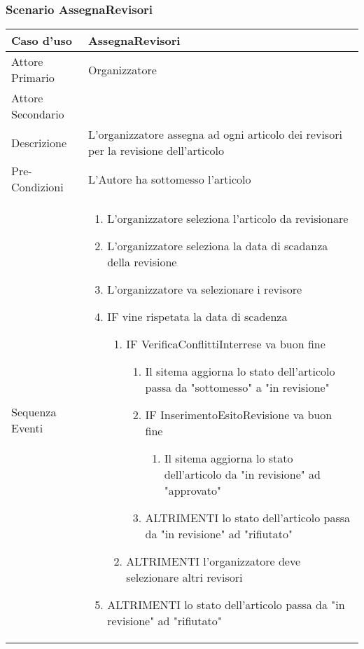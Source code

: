 \subsubsection{Scenario AssegnaRevisori}
\begin{tabular}{|p{3cm}|p{7cm}|}
\hline 
\rowcolor{Orchid}
Caso d'uso & AssegnaRevisori\\
\hline
Attore Primario & Organizzatore\\
\hline
Attore Secondario & \\
\hline
Descrizione &L'organizzatore  assegna ad ogni articolo dei revisori per la revisione dell'articolo\\
\hline
Pre-Condizioni& L'Autore ha sottomesso l'articolo\\
\hline
  Sequenza Eventi&
                   \begin{enumerate}
                   \item L'organizzatore seleziona l'articolo da revisionare
                   \item L'organizzatore seleziona la data di scadanza della revisione
                   \item L'organizzatore va selezionare i revisore
                   \item IF vine rispetata la data di scadenza
                   \begin{enumerate}
                    \item IF VerificaConflittiInterrese va buon fine
                    \begin{enumerate}
                      \item Il sitema aggiorna lo stato dell'articolo passa da "sottomesso" a "in revisione"
                      \item IF InserimentoEsitoRevisione va buon fine
                      \begin{enumerate}
                        \item Il sitema aggiorna lo stato dell'articolo da "in revisione" ad "approvato"
                      \end{enumerate}
                      \item ALTRIMENTI lo stato dell'articolo passa da "in revisione" ad "rifiutato"
                    \end{enumerate}
                    \item ALTRIMENTI l'organizzatore deve selezionare altri revisori
                   \end{enumerate}
                   \item ALTRIMENTI lo stato dell'articolo passa da "in revisione" ad "rifiutato"

\end{enumerate}
\end{tabular}
